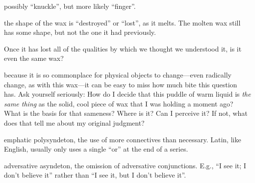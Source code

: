  possibly ``knuckle'', but more likely ``finger''.

 the shape of the wax is ``destroyed'' or ``lost'', as it melts. The molten wax still has some shape, but not the one it had previously.

 Once it has lost all of the qualities by which we thought we understood it, is it even the same wax?

 because it is so commonplace for physical objects to change---even radically change, as with this wax---it can be easy to miss how much bite this question has. Ask yourself seriously: How do I decide that this puddle of warm liquid is \textit{the same thing} as the solid, cool piece of wax that I was holding a moment ago? What is the basis for that sameness? Where is it? Can I perceive it? If not, what does that tell me about my original judgment?

 emphatic polysyndeton, the use of more connectives than necessary. Latin, like English, usually only uses a single ``or'' at the end of a series.

 adversative asyndeton, the omission of adversative conjunctions. E.g., ``I see it; I don't believe it'' rather than ``I see it, but I don't believe it''.

\clearpage


